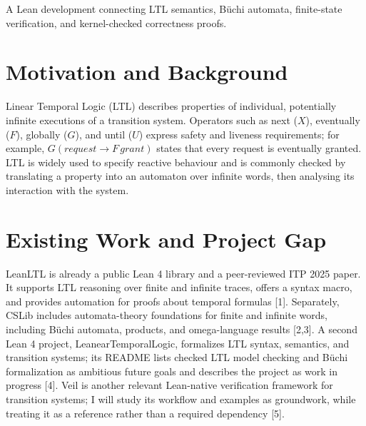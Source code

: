 \documentclass[10pt,a4paper]{article}
\begin{document}
\vfill
\begin{center}
  \begin{minipage}{0.72\textwidth}
    \centering\small\color{accent}
    A Lean development connecting LTL semantics, Büchi automata, finite-state
    verification, and kernel-checked correctness proofs.
  \end{minipage}
\end{center}
\vspace*{0.06\textheight}

\newpage

\section{Motivation and Background}

Linear Temporal Logic (LTL) describes properties of individual, potentially
infinite executions of a transition system. Operators such as next ($X$),
eventually ($F$), globally ($G$), and until ($U$) express safety and liveness
requirements; for example, $G(request\rightarrow F\,grant)$ states that every
request is eventually granted. LTL is widely used to specify reactive behaviour
and is commonly checked by translating a property into an automaton over infinite
words, then analysing its interaction with the system.

\section{Existing Work and Project Gap}

LeanLTL is already a public Lean 4 library and a peer-reviewed ITP 2025 paper. It
supports LTL reasoning over finite and infinite traces, offers a syntax macro,
and provides automation for proofs about temporal formulas [1]. Separately,
CSLib includes automata-theory foundations for finite and infinite words,
including Büchi automata, products, and omega-language results [2,3]. A second
Lean 4 project, LeanearTemporalLogic, formalizes LTL syntax, semantics, and
transition systems; its README lists checked LTL model checking and Büchi
formalization as ambitious future goals and describes the project as work in
progress [4]. Veil is another relevant Lean-native verification framework for
transition systems; I will study its workflow and examples as groundwork, while
treating it as a reference rather than a required dependency [5].
\end{document}

